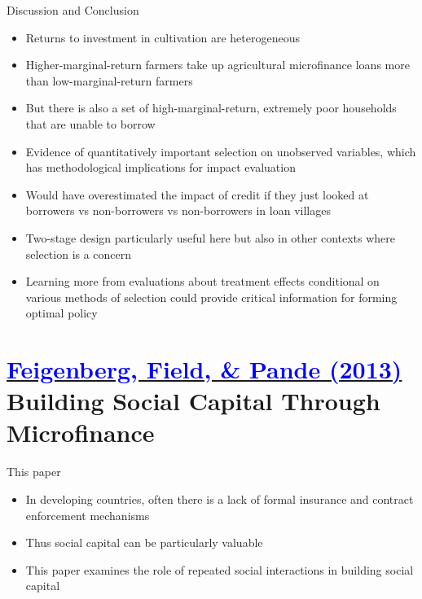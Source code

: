 \documentclass[11pt,notes=hide,aspectratio=169,mathserif]{beamer}
\begin{document}
\begin{frame}{Discussion and Conclusion}
\begin{itemize}
    \item Returns to investment in cultivation are heterogeneous
    \pause \item Higher-marginal-return farmers take up agricultural microﬁnance loans more than low-marginal-return farmers
    \pause \item But there is also a set of high-marginal-return, extremely poor households that are unable to borrow
    \pause \item Evidence of quantitatively important selection on unobserved variables, which has methodological implications for impact evaluation
    \pause \item Would have overestimated the impact of credit if they just looked at borrowers vs non-borrowers vs non-borrowers in loan villages
    \pause \item Two-stage design particularly useful here but also in other contexts where selection is a concern
    \pause \item Learning more from evaluations about treatment effects conditional on various methods of selection could provide critical information for forming optimal policy
\end{itemize}
\end{frame}

\section*{\href{https://www.nber.org/system/files/working_papers/w16018/w16018.pdf}{\textcolor{blue}{Feigenberg, Field, \& Pande (2013)}} \\[5mm] 
\textnormal{\small{Building Social Capital Through Microfinance}}}


\begin{frame}{This paper}

\begin{itemize}
\item In developing countries, often there is a lack of formal insurance and contract enforcement mechanisms
\pause  \item Thus social capital can be particularly valuable 
\pause \item This paper examines the role of repeated social interactions in building social capital
\end{itemize}
\end{frame}
\end{document}
